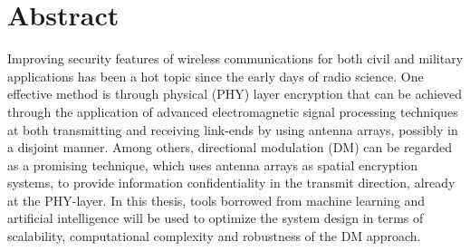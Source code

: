 
\cleardoublepage
{}
{}
\begingroup
\let\clearpage\relax
\let\cleardoublepage\relax
\let\cleardoublepage\relax

\chapter*{Abstract}

Improving security features of wireless communications for both civil and military applications has been a hot topic since the early days of radio science. One effective method is through physical (PHY) layer encryption that can be achieved through the application of advanced electromagnetic signal processing techniques at both transmitting and receiving link-ends by using antenna arrays, possibly in a disjoint manner. Among others, directional modulation (DM) can be regarded as a promising technique, which uses antenna arrays as spatial encryption systems, to provide information confidentiality in the transmit direction, already at the PHY-layer. In this thesis, tools borrowed from machine learning and artificial intelligence will be used to optimize the system design in terms of scalability, computational complexity and robustness of the DM approach.


\endgroup

\vfill
